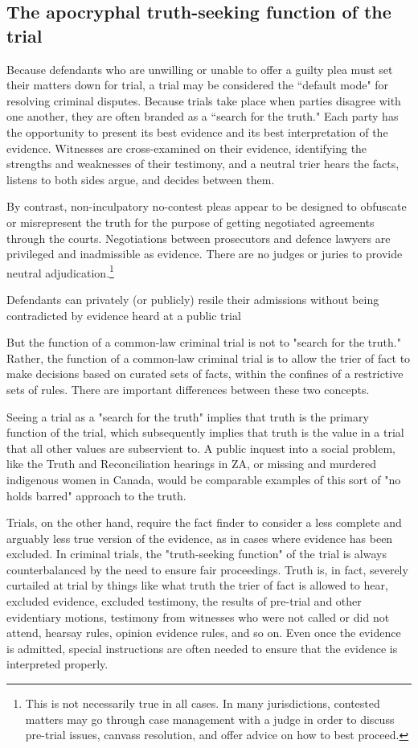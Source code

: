 \subsection{The apocryphal truth-seeking function of the trial}

Because defendants who are unwilling or unable to offer a guilty plea must set their matters down for trial, a trial may be considered the ``default mode" for resolving criminal disputes. Because trials take place when parties disagree with one another, they are often branded as a ``search for the truth." Each party has the opportunity to present its best evidence and its best interpretation of the evidence. Witnesses are cross-examined on their evidence, identifying the strengths and weaknesses of their testimony, and a neutral trier hears the facts, listens to both sides argue, and decides between them.

By contrast, non-inculpatory no-contest pleas appear to be designed to obfuscate or misrepresent the truth for the purpose of getting negotiated agreements through the courts. Negotiations between prosecutors and defence lawyers are privileged and inadmissible as evidence. There are no judges or juries to provide neutral adjudication.\footnote{This is not necessarily true in all cases. In many jurisdictions, contested matters may go through case management with a judge in order to discuss pre-trial issues, canvass resolution, and offer advice on how to best proceed. }

Defendants can privately (or publicly) resile their admissions without being contradicted by evidence heard at a public trial

But the function of a common-law criminal trial is not to "search for the truth." Rather, the function of a common-law criminal trial is to allow the trier of fact to make decisions based on curated sets of facts, within the confines of a restrictive sets of rules. There are important differences between these two concepts. 

Seeing a trial as a "search for the truth" implies that truth is the primary function of the trial, which subsequently implies that truth is the value in a trial that all other values are subservient to. A public inquest into a social problem, like the Truth and Reconciliation hearings in ZA, or missing and murdered indigenous women in Canada, would be comparable examples of this sort of "no holds barred" approach to the truth. 

Trials, on the other hand, require the fact finder to consider a less complete and arguably less true version of the evidence, as in cases where evidence has been excluded. In criminal trials, the "truth-seeking function" of the trial is always counterbalanced by the need to ensure fair proceedings. Truth is, in fact, severely curtailed at trial by things like what truth the trier of fact is allowed to hear, excluded evidence, excluded testimony, the results of pre-trial and other evidentiary motions, testimony from witnesses who were not called or did not attend, hearsay rules, opinion evidence rules, and so on. Even once the evidence is admitted, special instructions are often needed to ensure that the evidence is interpreted properly. 

